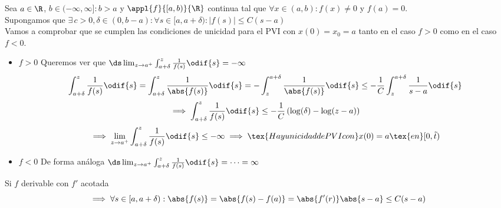 \begin{obs}
	Sea $a\in \R$, $b \in (-\infty, \infty] : b>a$ y $\appl{f}{[a,b)}{\R}$ continua tal que $\forall x \in (a,b) : f(x)\ne 0$ y $f(a)=0$. \\
	Supongamos que $\exists\, c >0, \delta \in (0, b-a) : \forall s \in [a, a+\delta) : |f(s)|\leq C(s -a)$ \\
	Vamos a comprobar que se cumplen las condiciones de unicidad para el PVI con $x(0)=x_0=a$ tanto en el caso $f>0$ como en el caso $f<0$.
	\begin{itemize}
		\item $\boxed{f>0}$ Queremos ver que $\ds \lim_{z\to a^+}\int_{a+\delta}^{z} \frac{1}{f(s)}\odif{s} = -\infty$
		\[\int_{a+\delta}^{z} \frac{1}{f(s)}\odif{s} = \int_{a+\delta}^{z} \frac{1}{\abs{f(s)}}\odif{s}=-\int_{z}^{a+\delta} \frac{1}{\abs{f(s)}}\odif{s} \leq -\frac{1}{C} \int_{z}^{a+\delta} \frac{1}{s-a}\odif{s}\]
		\[\implies \int_{a+\delta}^{z} \frac{1}{f(s)}\odif{s} \leq -\frac{1}{C}\left(\log(\delta)-\log(z-a)\right)\]
		\[\implies \lim_{z\to a^+}\int_{a+\delta}^{z} \frac{1}{f(s)}\odif{s} \leq -\infty \implies \tex{ Hay unicidad de PVI con }x(0)=a \tex{ en } [0, \tilde{t})\]
		\item $\boxed{f<0}$ De forma análoga $\ds \lim_{z\to a^+}\int_{a+\delta}^{z} \frac{1}{f(s)}\odif{s} = \cdots = \infty$
	\end{itemize}
	Si $f$ derivable con $f'$ acotada
	\[\implies \forall s \in [a, a+\delta) : \abs{f(s)}=\abs{f(s)-f(a)}=\abs{f'(r)}\abs{s-a}\leq C(s-a)\]
\end{obs}